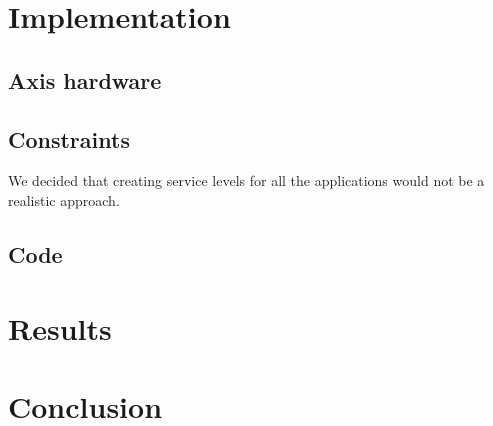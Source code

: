 \documentclass{LTHthesis}
\begin{document}
\chapter{Implementation}
\section{Axis hardware} %
\section{Constraints} %
We decided that creating service levels for all the applications would not be a realistic approach.
\section{Code} 
\chapter{Results}
\chapter{Conclusion}
\printbibliography  %
\end{document}
